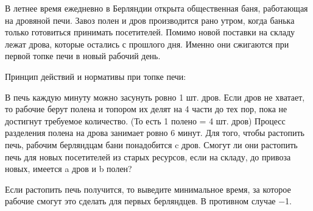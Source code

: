 В летнее время ежедневно в Берляндии открыта общественная баня, работающая на дровяной печи. Завоз полен и дров производится рано утром, когда банька только готовиться принимать посетителей. Помимо новой поставки на складу лежат дрова, которые остались с прошлого дня. Именно они сжигаются при первой топке печи в новый рабочий день.

Принцип действий и нормативы при топке печи:

В печь каждую минуту можно засунуть ровно 1 шт. дров.
Если дров не хватает, то рабочие берут полена и топором их делят на 4 части до тех пор, пока не достигнут требуемое количество. (То есть 1 полено = 4 шт. дров)
Процесс разделения полена на дрова занимает ровно 6 минут.
Для того, чтобы растопить печь, рабочим берляндцам бани понадобится c дров. Смогут ли они растопить печь для новых посетителей из старых ресурсов, если на складу, до привоза новых, имеется a дров и b полен?

Если растопить печь получится, то выведите минимальное время, за которое рабочие смогут это сделать для первых берляндцев. В противном случае −1.